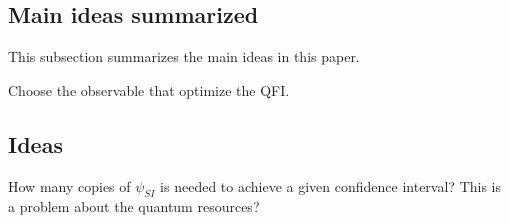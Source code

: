 \documentclass[../../note.tex]{subfiles}
\begin{document}
\subsection{Main ideas summarized}
This subsection summarizes the main ideas in this paper.

Choose the observable that optimize the QFI.


\subsection{Ideas}
How many copies of $\psi_{SI}$ is needed to achieve a given confidence interval? This is a problem about the quantum resources?





\end{document}
